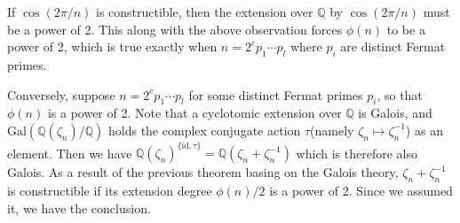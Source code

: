 \documentclass{article}
\begin{document}
If $\cos(2\pi/n)$ is constructible, then the extension over $\mathbb{Q}$ by $\cos(2\pi/n)$ must be a power of 2. This along with the above observation forces $\phi(n)$ to be a power of 2, which is true exactly when $n = 2^c p_1 \cdots p_l$ where $p_i$ are distinct Fermat primes.

Conversely, suppose $n = 2^c p_1 \cdots p_l$ for some distinct Fermat primes $p_i$, so that $\phi(n)$ is a power of 2. Note that a cyclotomic extension over $\mathbb{Q}$ is Galois, and $\mathrm{Gal}(\mathbb{Q}(\zeta_n) / \mathbb{Q})$ holds the complex conjugate action $\tau$(namely $\zeta_n \mapsto \zeta_n^{-1}$) as an element. Then we have $\mathbb{Q}(\zeta_n)^{\{\mathrm{id}, \tau\}} = \mathbb{Q}(\zeta_n + \zeta_n^{-1})$ which is therefore also Galois. As a result of the previous theorem basing on the Galois theory, $\zeta_n + \zeta_n^{-1}$ is constructible if its extension degree $\phi(n)/2$ is a power of 2. Since we assumed it, we have the conclusion.
\end{document}
